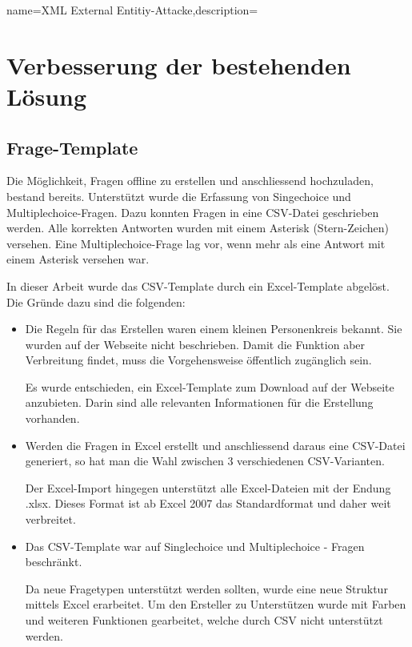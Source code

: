 
 {name={XML External Entitiy-Attacke},description={}} %

\section{Verbesserung der bestehenden Lösung}

\subsection{Frage-Template}
Die Möglichkeit, Fragen offline zu erstellen und anschliessend hochzuladen, bestand bereits. Unterstützt wurde die Erfassung von Singechoice und Multiplechoice-Fragen. Dazu konnten Fragen in eine CSV-Datei geschrieben werden. Alle korrekten Antworten wurden mit einem Asterisk (Stern-Zeichen) versehen. Eine Multiplechoice-Frage lag vor, wenn mehr als eine Antwort mit einem Asterisk versehen war.

In dieser Arbeit wurde das CSV-Template durch ein Excel-Template abgelöst. Die Gründe dazu sind die folgenden:
\begin{itemize}
	\item Die Regeln für das Erstellen waren einem kleinen Personenkreis bekannt. Sie wurden auf der Webseite nicht beschrieben. Damit die Funktion aber Verbreitung findet, muss die Vorgehensweise öffentlich zugänglich sein.
	
	Es wurde entschieden, ein Excel-Template zum Download auf der Webseite anzubieten. Darin sind alle relevanten Informationen für die Erstellung vorhanden.
	
	\item Werden die Fragen in Excel erstellt und anschliessend daraus eine CSV-Datei generiert, so hat man die Wahl zwischen 3 verschiedenen CSV-Varianten.
	
	Der Excel-Import hingegen unterstützt alle Excel-Dateien mit der Endung .xlsx. Dieses Format ist ab Excel 2007 das Standardformat und daher weit verbreitet.
	\cite{microsoft2016}
	
	\item Das CSV-Template war auf Singlechoice und Multiplechoice - Fragen beschränkt.
	
	Da neue Fragetypen unterstützt werden sollten, wurde eine neue Struktur mittels Excel erarbeitet. Um den Ersteller zu Unterstützen wurde mit Farben und weiteren Funktionen gearbeitet, welche durch CSV nicht unterstützt werden.
\end{itemize}

